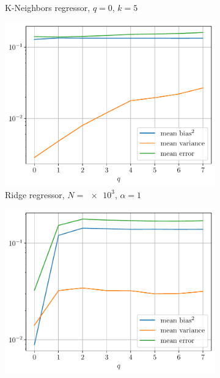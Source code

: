 \documentclass[a4paper, 12pt]{article}
\begin{document}
\begin{enumerate}[label=(\alph*)]
\begin{figure}[h]
\begin{subfigure}{0.48\textwidth}
                \caption{K-Neighbors regressor, $q = 0$, $k = 5$}
                \vspace{0.5em}
            \end{subfigure}
            \begin{subfigure}{0.48\textwidth}
                \includegraphics[width=\textwidth]{resources/pdf/rrg_mean_q.pdf}
                \caption{Ridge regressor, $N = \num{e3}$, $\alpha = 1$}
                \vspace{0.5em}
            \end{subfigure}
            \begin{subfigure}{0.48\textwidth}
                \includegraphics[width=\textwidth]{resources/pdf/knr_mean_q.pdf}

\end{subfigure}
\end{figure}
\end{enumerate}
\end{document}
